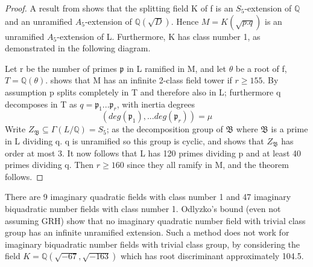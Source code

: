 \documentclass[preprint,12pt,reqno]{elsarticle}
\begin{document}
\begin{proof}
A result from \cite{KOND} shows that the splitting field K
of f is an $S_5$-extension of $\mathbb{Q}$ and an unramified $A_5$-extension of $\mathbb{Q}(\sqrt{D})$. Hence $M=K(\sqrt{p.q})$ is an
unramified $A_5$-extension of L. Furthermore, K has class number 1, as demonstrated in the following diagram.
\begin{center}
\end{center}

Let r be the number of primes $\mathfrak{p}$ in L ramified in M, and let $\theta$ be a root of f, $T = \mathbb{Q}(\theta)$. \cite{MAR1} shows that M has an infinite 2-class field tower if $r\geq 155$. By assumption p splits completely in T and therefore also in L; furthermore q decomposes in T as $q = \mathfrak{p}_1...\mathfrak{p}_r$, with inertia degrees
\begin{equation}
    (deg(\mathfrak{p}_1),...deg(\mathfrak{p}_r))=\mu 
\end{equation}
Write $Z_\mathfrak{B}\subseteq\Gamma(L/\mathbb{Q}) = S_5$; as the decomposition group of $\mathfrak{B}$ where $\mathfrak{B}$ is a prime in L dividing q. q is unramified so this group is cyclic, and \cite{ART1} shows that $Z_\mathfrak{B}$ has order at most 3.  It now follows that L has 120 primes dividing p and at least 40 primes dividing q. Then $r\geq 160$ since they all ramify in M, and the theorem follows.
\end{proof}
There are 9 imaginary quadratic fields with class number 1 and 47 imaginary biquadratic number fields with class number 1. Odlyzko's bound (even not assuming GRH) show that no imaginary quadratic number field with trivial class group has an infinite unramified extension. Such a method does not work for imaginary biquadratic number fields with trivial class group, by considering the field $K=\mathbb{Q}(\sqrt{-67},\sqrt{-163})$ which has root discriminant approximately 104.5.
\end{document}
